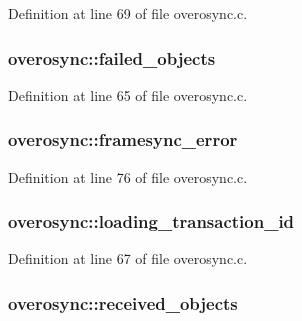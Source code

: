 Definition at line 69 of file overosync.\-c.

\hypertarget{structoverosync_aaa5dfd30a46b95fadb58527bc878b2a9}{
\subsubsection[{failed\-\_\-objects}]{ overosync\-::failed\-\_\-objects}}\label{structoverosync_aaa5dfd30a46b95fadb58527bc878b2a9}


Definition at line 65 of file overosync.\-c.

\hypertarget{structoverosync_a628e392bbafa6a9bdac1085b68fc13bb}{
\subsubsection[{framesync\-\_\-error}]{ overosync\-::framesync\-\_\-error}}\label{structoverosync_a628e392bbafa6a9bdac1085b68fc13bb}


Definition at line 76 of file overosync.\-c.

\hypertarget{structoverosync_a92326e8268b02ad216b020f15bac9342}{
\subsubsection[{loading\-\_\-transaction\-\_\-id}]{ overosync\-::loading\-\_\-transaction\-\_\-id}}\label{structoverosync_a92326e8268b02ad216b020f15bac9342}


Definition at line 67 of file overosync.\-c.

\hypertarget{structoverosync_a44c38abb842382371674de5e2e1b55fe}{
\subsubsection[{received\-\_\-objects}]{ overosync\-::received\-\_\-objects}}\label{structoverosync_a44c38abb842382371674de5e2e1b55fe}


